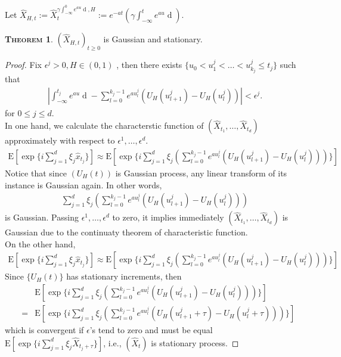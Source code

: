 \documentclass[a4paper, twoside, 11pt]{article}
\theoremstyle{definition}
\newtheorem{theorem}[definition]{\scshape Theorem}
\newcommand{\brkt}[1]{\left({#1} \right)}
\begin{document}
Let $\hat{X}_{H,t}:= \hat{X}_t^{\gamma\int_{-\infty}^0 e^{au}\mathop{dU_H(u)}, H} := e^{-at}\brkt{\gamma\int_{-\infty}^t e^{au}\mathop{dU_H(u)}}$.
\begin{theorem}
  $(\hat{X}_{H,t})_{t\ge 0}$ is Gaussian and stationary.
  \label{sec:gsp}
\end{theorem}

\begin{proof}
  Fix $\epsilon^j > 0, H\in (0,1)$ , then there exists  $\{u_0<u_1^j<\dots<u^j_{k_j}\le t_j\}$ such that
  \begin{eqnarray*}
	|\int_{-\infty}^{t_j} e^{au}\mathop{dU_H(u)} - \sum_{l=0}^{k_j-1} e^{au^j_l}(U_H(u^j_{l+1}) - U_H(u^j_{l}))| < \epsilon^j.
  \end{eqnarray*}
  for $0 \le j \le d $.\\
  In one hand, we calculate the characterstic function of $(\hat{X}_{t_1},\dots, \hat{X}_{t_d})$ approximately with respect to $\epsilon^1,\dots,\epsilon^d$.
  \begin{eqnarray*}
	\mathrm{E}[\exp\{i\sum_{j=1}^d \xi_j\hat{x}_{t_j}\}] \approx \mathrm{E}[\exp\{ i\sum_{j=1}^d \xi_j\brkt{\sum_{l=0}^{k_j-1} e^{au^j_l}(U_H(u^j_{l+1}) - U_H(u^j_{l})) }\}]
  \end{eqnarray*}
  Notice that since $(U_H(t))$ is Gaussian process, any linear transform of its instance is Gaussian again. In other words, 
  \begin{eqnarray*}
	\sum_{j=1}^d \xi_j \brkt{\sum_{l=0}^{k_j-1} e^{au^j_l}(U_H(u^j_{l+1}) - U_H(u^j_{l})) }
  \end{eqnarray*}
  is Gaussian. Passing $\epsilon^1,\dots,\epsilon^d$ to zero, it implies immediately $(\hat{X}_{t_1},\dots, \hat{X}_{t_d})$ is Gaussian due to the continuaty theorem of characteristic function.\\
  On the other hand,
	\begin{eqnarray*}
	\mathrm{E}[\exp\{i\sum_{j=1}^d \xi_j\hat{x}_{t_j }\}] \approx \mathrm{E}[\exp\{ i\sum_{j=1}^d \xi_j\brkt{\sum_{l=0}^{k_j-1} e^{au^j_l}(U_H(u^j_{l+1}) - U_H(u^j_{l})) }\}]
  \end{eqnarray*}
  Since $\{U_H(t)\}$ has stationary increments, then 
  \begin{eqnarray*}
	&& \mathrm{E}[\exp\{ i\sum_{j=1}^d \xi_j\brkt{\sum_{l=0}^{k_j-1} e^{au^j_l}(U_H(u^j_{l+1}) - U_H(u^j_{l})) }\}] \\
	&=& \mathrm{E}[\exp\{ i\sum_{j=1}^d \xi_j\brkt{\sum_{l=0}^{k_j-1} e^{au^j_l}(U_H(u^j_{l+1}+\tau) - U_H(u^j_{l}+\tau)) }\}]
  \end{eqnarray*}
  which is convergent if $\epsilon$'s tend to zero and must be equal $\mathrm{E}[\exp\{ i\sum_{j=1}^d \xi_j \hat{X}_{t_j+\tau}\}]$, i.e., $(\hat{X}_t)$ is stationary process.
\end{proof}
\end{document}
